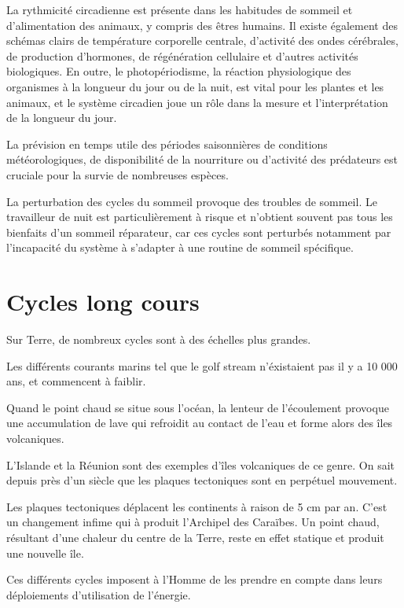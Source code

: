 La rythmicité circadienne est présente dans les habitudes de sommeil et
d'alimentation des animaux, y compris des êtres humains. Il existe également
des schémas clairs de température corporelle centrale, d'activité des ondes cérébrales,
de production d'hormones, de régénération cellulaire et d'autres activités biologiques.
En outre, le photopériodisme, la réaction physiologique des organismes à la longueur du
jour ou de la nuit, est vital pour les plantes et les animaux, et le système circadien
joue un rôle dans la mesure et l'interprétation de la longueur du jour.

La prévision en temps utile des périodes saisonnières de conditions météorologiques,
de disponibilité de la nourriture ou d'activité des prédateurs est cruciale pour
la survie de nombreuses espèces.

La perturbation des cycles du sommeil provoque des troubles de sommeil.
Le travailleur de nuit est particulièrement à risque et n’obtient souvent
pas tous les bienfaits d’un sommeil réparateur, car ces cycles sont perturbés
notamment par l’incapacité du système à s’adapter à une routine de sommeil spécifique.

\section{Cycles long cours}

Sur Terre, de nombreux cycles sont à des échelles plus grandes.

Les différents courants marins tel que le golf stream n'éxistaient pas il y a 10 000 ans, et commencent à faiblir.

Quand le point chaud se situe sous l'océan, la lenteur de l'écoulement provoque une accumulation de
lave qui refroidit au contact de l'eau et forme alors des îles volcaniques.

L'Islande et la Réunion sont des exemples d'îles volcaniques de ce genre.
On sait depuis près d'un siècle que les plaques tectoniques sont en perpétuel mouvement.

Les plaques tectoniques déplacent les continents à raison de 5 cm par an. C'est un changement infime
qui à produit l'Archipel des Caraïbes. Un point chaud, résultant d'une chaleur du centre de la Terre,
reste en effet statique et produit une nouvelle île.

Ces différents cycles imposent à l'Homme de les prendre en compte dans leurs déploiements d'utilisation de l'énergie.

